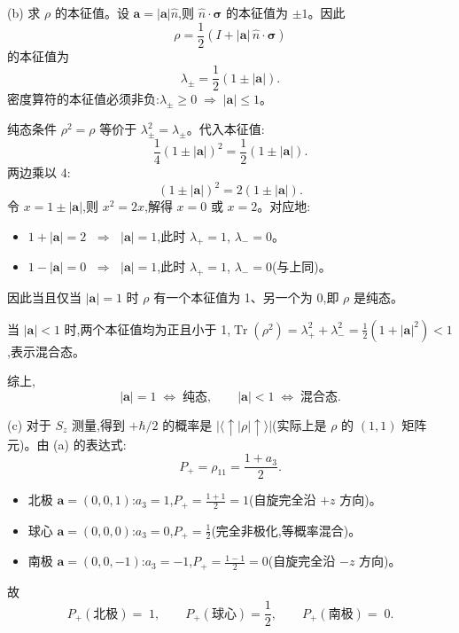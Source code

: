 \begin{solution}
(b) 求 $\rho$ 的本征值。设 $\mathbf a = |\mathbf a|\hat n$,则 $\hat n\cdot\boldsymbol\sigma$ 的本征值为 $\pm 1$。因此
\[
\rho = \frac12(I + |\mathbf a|\,\hat n\cdot\boldsymbol\sigma)
\]
的本征值为
\[
\lambda_\pm = \frac12(1 \pm |\mathbf a|).
\]
密度算符的本征值必须非负:$\lambda_\pm \ge 0 \;\Longrightarrow\; |\mathbf a| \le 1$。

纯态条件 $\rho^2 = \rho$ 等价于 $\lambda_\pm^2 = \lambda_\pm$。代入本征值:
\[
\frac14(1\pm|\mathbf a|)^2 = \frac12(1\pm|\mathbf a|).
\]
两边乘以 4:
\[
(1\pm|\mathbf a|)^2 = 2(1\pm|\mathbf a|).
\]
令 $x = 1\pm|\mathbf a|$,则 $x^2 = 2x$,解得 $x=0$ 或 $x=2$。对应地:
\begin{itemize}
\item $1+|\mathbf a| = 2$ $\;\Longrightarrow\;$ $|\mathbf a| = 1$,此时 $\lambda_+ = 1$, $\lambda_- = 0$。
\item $1-|\mathbf a| = 0$ $\;\Longrightarrow\;$ $|\mathbf a| = 1$,此时 $\lambda_+ = 1$, $\lambda_- = 0$(与上同)。
\end{itemize}
因此当且仅当 $|\mathbf a| = 1$ 时 $\rho$ 有一个本征值为 1、另一个为 0,即 $\rho$ 是纯态。

当 $|\mathbf a| < 1$ 时,两个本征值均为正且小于 1,$\operatorname{Tr}(\rho^2) = \lambda_+^2 + \lambda_-^2 = \frac12(1+|\mathbf a|^2) < 1$,表示混合态。

综上,
\[
\boxed{|\mathbf a| = 1 \;\Longleftrightarrow\; \text{纯态},\qquad
|\mathbf a| < 1 \;\Longleftrightarrow\; \text{混合态}.}
\]

(c) 对于 $S_z$ 测量,得到 $+\hbar/2$ 的概率是 $|\langle\uparrow|\rho|\uparrow\rangle|$(实际上是 $\rho$ 的 $(1,1)$ 矩阵元)。由 (a) 的表达式:
\[
P_+ = \rho_{11} = \frac{1+a_3}{2}.
\]
\begin{itemize}
\item 北极 $\mathbf a = (0,0,1)$:$a_3 = 1$,$P_+ = \frac{1+1}{2} = 1$(自旋完全沿 $+z$ 方向)。
\item 球心 $\mathbf a = (0,0,0)$:$a_3 = 0$,$P_+ = \frac{1}{2}$(完全非极化,等概率混合)。
\item 南极 $\mathbf a = (0,0,-1)$:$a_3 = -1$,$P_+ = \frac{1-1}{2} = 0$(自旋完全沿 $-z$ 方向)。
\end{itemize}
故
\[
\boxed{P_+(\text{北极})=\;1,\qquad P_+(\text{球心})=\frac12,\qquad P_+(\text{南极})=\;0.}
\]


\end{solution}
